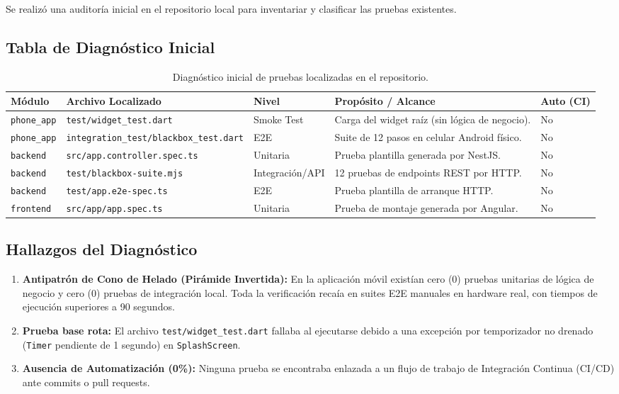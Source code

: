 \documentclass[11pt,a4paper]{article}
\begin{document}
Se realizó una auditoría inicial en el repositorio local para inventariar y clasificar las pruebas existentes.

\subsection{Tabla de Diagnóstico Inicial}

\begin{table}[htbp]
\centering
\small
\begin{tabularx}{\textwidth}{p{2.8cm}p{4.2cm}p{2.2cm}Xp{1.8cm}}
\toprule
\textbf{Módulo} & \textbf{Archivo Localizado} & \textbf{Nivel} & \textbf{Propósito / Alcance} & \textbf{Auto (CI)} \\
\midrule
\texttt{phone\_app} & \texttt{test/widget\_test.dart} & Smoke Test & Carga del widget raíz (sin lógica de negocio). & No \\
\texttt{phone\_app} & \texttt{integration\_test/blackbox\_test.dart} & E2E & Suite de 12 pasos en celular Android físico. & No \\
\texttt{backend} & \texttt{src/app.controller.spec.ts} & Unitaria & Prueba plantilla generada por NestJS. & No \\
\texttt{backend} & \texttt{test/blackbox-suite.mjs} & Integración/API & 12 pruebas de endpoints REST por HTTP. & No \\
\texttt{backend} & \texttt{test/app.e2e-spec.ts} & E2E & Prueba plantilla de arranque HTTP. & No \\
\texttt{frontend} & \texttt{src/app/app.spec.ts} & Unitaria & Prueba de montaje generada por Angular. & No \\
\bottomrule
\end{tabularx}
\caption{Diagnóstico inicial de pruebas localizadas en el repositorio.}
\label{tab:diagnostico_inicial}
\end{table}

\subsection{Hallazgos del Diagnóstico}
\begin{enumerate}
    \item \textbf{Antipatrón de Cono de Helado (Pirámide Invertida):} En la aplicación móvil existían cero (0) pruebas unitarias de lógica de negocio y cero (0) pruebas de integración local. Toda la verificación recaía en suites E2E manuales en hardware real, con tiempos de ejecución superiores a 90 segundos.
    \item \textbf{Prueba base rota:} El archivo \texttt{test/widget\_test.dart} fallaba al ejecutarse debido a una excepción por temporizador no drenado (\texttt{Timer} pendiente de 1 segundo) en \texttt{SplashScreen}.
    \item \textbf{Ausencia de Automatización (0\%):} Ninguna prueba se encontraba enlazada a un flujo de trabajo de Integración Continua (CI/CD) ante commits o pull requests.
\end{enumerate}
\end{document}
